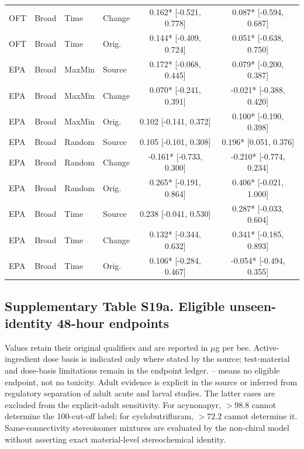 \begin{longtable}{llllcc}
OFT & Broad & Time & Change & 0.162* [-0.521, 0.778] & 0.087* [-0.594, 0.687] \\
OFT & Broad & Time & Orig. & 0.144* [-0.409, 0.724] & 0.051* [-0.638, 0.750] \\
EPA & Broad & MaxMin & Source & 0.172* [-0.068, 0.445] & 0.079* [-0.200, 0.387] \\
EPA & Broad & MaxMin & Change & 0.070* [-0.241, 0.391] & -0.021* [-0.388, 0.420] \\
EPA & Broad & MaxMin & Orig. & 0.102 [-0.141, 0.372] & 0.100* [-0.190, 0.398] \\
EPA & Broad & Random & Source & 0.105 [-0.101, 0.308] & 0.196* [0.051, 0.376] \\
EPA & Broad & Random & Change & -0.161* [-0.733, 0.300] & -0.210* [-0.774, 0.234] \\
EPA & Broad & Random & Orig. & 0.265* [-0.191, 0.864] & 0.406* [-0.021, 1.000] \\
EPA & Broad & Time & Source & 0.238 [-0.041, 0.530] & 0.287* [-0.033, 0.604] \\
EPA & Broad & Time & Change & 0.132* [-0.344, 0.632] & 0.341* [-0.185, 0.893] \\
EPA & Broad & Time & Orig. & 0.106* [-0.284, 0.467] & -0.054* [-0.494, 0.355] \\

\end{longtable}\endgroup

\subsection*{Supplementary Table S19a. Eligible unseen-identity 48-hour endpoints}

Values retain their original qualifiers and are reported in $\mu$g per bee. Active-ingredient dose basis is indicated only where stated by the source; test-material and dose-basis limitations remain in the endpoint ledger. -- means no eligible endpoint, not no toxicity. Adult evidence is explicit in the source or inferred from regulatory separation of adult acute and larval studies. The latter cases are excluded from the explicit-adult sensitivity. For acynonapyr, $>98.8$ cannot determine the 100-cut-off label; for cyclobutrifluram, $>72.2$ cannot determine it. Same-connectivity stereoisomer mixtures are evaluated by the non-chiral model without asserting exact material-level stereochemical identity.

\begingroup\small\setlength{\tabcolsep}{4pt}

